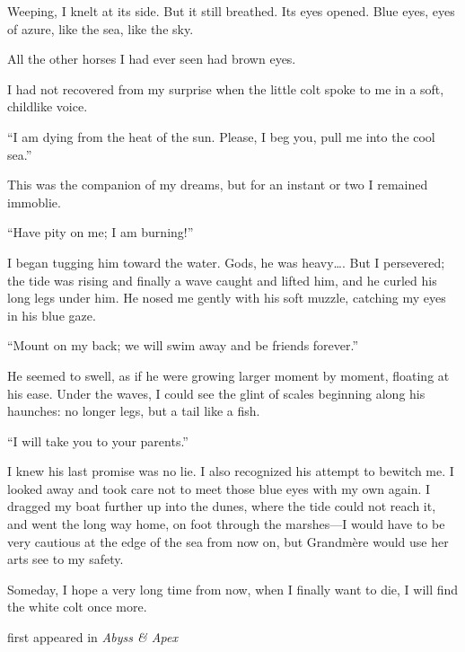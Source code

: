 Weeping, I knelt at its side. But it still breathed. Its eyes opened.
Blue eyes, eyes of azure, like the sea, like the sky.

All the other horses I had ever seen had brown eyes.

I had not recovered from my surprise when the little colt spoke to me in
a soft, childlike voice.

``I am dying from the heat of the sun. Please, I beg you, pull me into
the cool sea.''

This was the companion of my dreams, but for an instant or two I
remained immoblie.

``Have pity on me; I am burning!''

I began tugging him toward the water. Gods, he was heavy\ldots{}. But I
persevered; the tide was rising and finally a wave caught and lifted
him, and he curled his long legs under him. He nosed me gently with his
soft muzzle, catching my eyes in his blue gaze.

``Mount on my back; we will swim away and be friends forever.''

He seemed to swell, as if he were growing larger moment by moment,
floating at his ease. Under the waves, I could see the glint of scales
beginning along his haunches: no longer legs, but a tail like a fish.

``I will take you to your parents.''

I knew his last promise was no lie. I also recognized his attempt to
bewitch me. I looked away and took care not to meet those blue eyes with
my own again. I dragged my boat further up into the dunes, where the
tide could not reach it, and went the long way home, on foot through the
marshes---I would have to be very cautious at the edge of the sea from
now on, but Grandmère would use her arts see to my safety.

Someday, I hope a very long time from now, when I finally want to die, I
will find the white colt once more.

first appeared in \emph{Abyss \& Apex}
